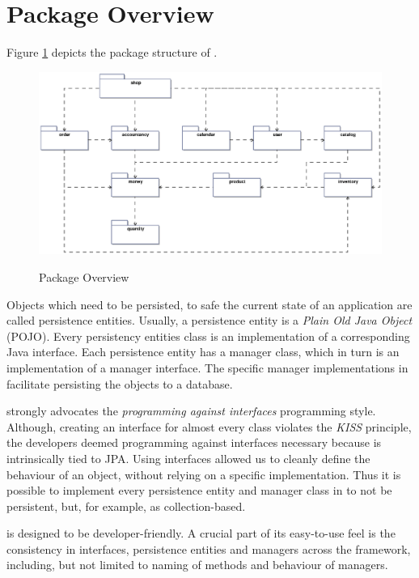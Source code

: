 \section{Package Overview}
Figure \ref{package_overview} depicts the package structure of \salespoint{}.
\begin{figure}[ht]
	\centering
  \includegraphics[width=1.0\textwidth]{images/Package_Overview.eps}
	\label{package_overview}
	\caption{Package Overview}
\end{figure}


Objects which need to be persisted, to safe the current state of an application are called persistence entities.
Usually, a persistence entity is a \textit{Plain Old Java Object} (POJO).
Every persistency entities class is an implementation of a corresponding Java interface.
Each persistence entity has a manager class, which in turn is an implementation of a manager interface.
The specific manager implementations in \salespoint{} facilitate persisting the objects to a database.

\salespoint{} strongly advocates the \textit{programming against interfaces} programming style.
Although, creating an interface for almost every class violates the \textit{KISS} principle, the developers deemed programming against interfaces necessary because \salespoint{} is intrinsically tied to JPA.
Using interfaces allowed us to cleanly define the behaviour of an object, without relying on a specific implementation.
Thus it is possible to implement every persistence entity and manager class in \salespoint{} to not be persistent, but, for example, as collection-based.

\salespoint{} is designed to be developer-friendly.
A crucial part of its easy-to-use feel is the consistency in interfaces, persistence entities and managers across the framework, including, but not limited to naming of methods and behaviour of managers.


